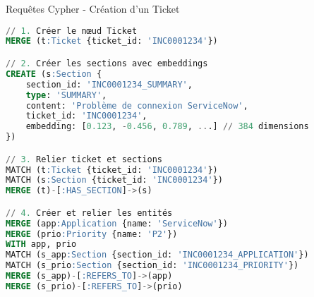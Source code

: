 \documentclass[10pt, aspectratio=169]{beamer}
\begin{document}
\begin{frame}[fragile]{Requêtes Cypher - Création d'un Ticket}
    \begin{lstlisting}[language=SQL, basicstyle=\scriptsize\ttfamily, keywordstyle=\color{neo4jgreen}\bfseries]
// 1. Créer le nœud Ticket
MERGE (t:Ticket {ticket_id: 'INC0001234'})

// 2. Créer les sections avec embeddings
CREATE (s:Section {
    section_id: 'INC0001234_SUMMARY',
    type: 'SUMMARY',
    content: 'Problème de connexion ServiceNow',
    ticket_id: 'INC0001234',
    embedding: [0.123, -0.456, 0.789, ...] // 384 dimensions
})

// 3. Relier ticket et sections
MATCH (t:Ticket {ticket_id: 'INC0001234'})
MATCH (s:Section {ticket_id: 'INC0001234'})
MERGE (t)-[:HAS_SECTION]->(s)

// 4. Créer et relier les entités
MERGE (app:Application {name: 'ServiceNow'})
MERGE (prio:Priority {name: 'P2'})
WITH app, prio
MATCH (s_app:Section {section_id: 'INC0001234_APPLICATION'})
MATCH (s_prio:Section {section_id: 'INC0001234_PRIORITY'})
MERGE (s_app)-[:REFERS_TO]->(app)
MERGE (s_prio)-[:REFERS_TO]->(prio)
    \end{lstlisting}
\end{frame}
\end{document}
